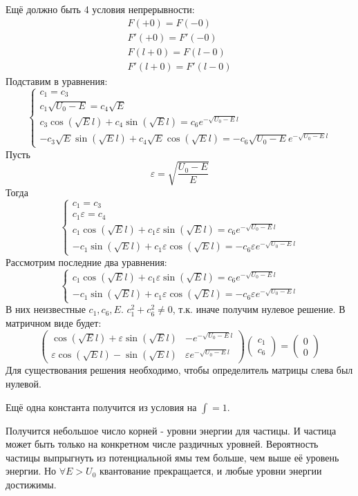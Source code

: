 Ещё должно быть 4 условия непрерывности:
\[
	\begin{aligned}
	F(+0)=F(-0) \\
	F'(+0)=F'(-0) \\
	F(l+0)=F(l-0) \\
	F'(l+0)=F'(l-0)
\end{aligned}
\]
Подставим в уравнения:
\[
	\left\{
	\begin{aligned}
		c_1 = c_3 \\
		c_1 \sqrt{U_0 - E} = c_4 \sqrt{E} \\
		c_3 \cos \left( \sqrt{E} l\right) + c_4 \sin \left( \sqrt{E}l\right) = c_6 e^{-\sqrt{U_0-E}l} \\
		-c_3 \sqrt{E} \sin \left( \sqrt{E} l\right) + c_4 \sqrt{E} \cos \left(\sqrt{E} l \right) = -c_6 \sqrt{U_0 - E} e^{-\sqrt{U_0 - E}l}
	\end{aligned}
	\right.
\]
Пусть 
\[
	\varepsilon = \sqrt{\frac{U_0-E}{E}}
\]
Тогда
\[
	\left\{
	\begin{aligned}
		c_1 = c_3 \\
		c_1 \varepsilon = c_4  \\
		c_1 \cos \left( \sqrt{E} l\right) + c_1 \varepsilon \sin \left( \sqrt{E}l\right) = c_6 e^{-\sqrt{U_0-E}l} \\
		-c_1 \sin \left( \sqrt{E} l\right) + c_1 \varepsilon \cos \left(\sqrt{E} l \right) = -c_6 \varepsilon e^{-\sqrt{U_0 - E}l}
	\end{aligned}
	\right.
\]
Рассмотрим последние два уравнения:
\[
	\left\{
		\begin{aligned}
		c_1 \cos \left( \sqrt{E} l\right) + c_1 \varepsilon \sin \left( \sqrt{E}l\right) = c_6 e^{-\sqrt{U_0-E}l} \\
		-c_1  \sin \left( \sqrt{E} l\right) + c_1 \varepsilon \cos \left(\sqrt{E} l \right) = -c_6 \varepsilon e^{-\sqrt{U_0 - E}l}
	\end{aligned}
	\right.
\]
В них неизвестные $c_1, c_6, E$. $c_1^2 + c_6^2 \ne 0$, т.к. иначе получим нулевое решение. В матричном виде будет:
\[
	\begin{pmatrix} \cos \left( \sqrt{E} l\right) + \varepsilon \sin \left( \sqrt{E} l\right) & -e^{-\sqrt{U_0-E}l} \\ \varepsilon \cos \left( \sqrt{E} l\right) - \sin \left( \sqrt{E} l\right) & \varepsilon e^{-\sqrt{U_0-E}l}\end{pmatrix} \begin{pmatrix} c_1 \\ c_6\end{pmatrix} = \begin{pmatrix} 0 \\ 0\end{pmatrix}
\]
Для существования решения необходимо, чтобы определитель матрицы слева был нулевой.

Ещё одна константа получится из условия на $\int=1$.

Получится небольшое число корней - уровни энергии для частицы. И частица может быть только на конкретном числе раздичных уровней. Вероятность частицы выпрыгнуть из потенциальной ямы тем больше, чем выше её уровень энергии. Но $\forall E > U_0$ квантование прекращается, и любые уровни энергии достижимы.
